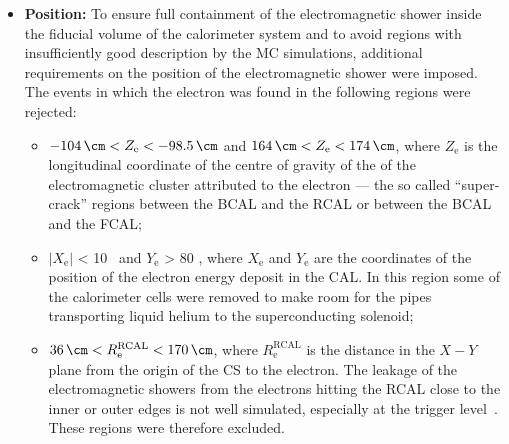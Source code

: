 \begin{itemize}
	have a distance of closest approach between the track extrapolation point at front surface of the CAL and the energy-cluster position of less than 10 cm. The track energy as measured by the tracking system had to be greater than 3 \GeV, because for higher energy electrons the bremsstrahlung energy loss is significant. In case the electron track was outside the acceptance region\footnote{The tracking system covers the region of polar angles restricted to $0.3 < \theta_\text{e} < 2.85$. } of the tracking detectors, the information from the calorimeter system was used to determine the position of the electron candidate.
	\item \textbf{Position:} To ensure full containment of the electromagnetic shower inside the fiducial volume of the calorimeter system and to avoid regions with insufficiently good description by the MC simulations, additional requirements on the position of the electromagnetic shower were imposed. The events in which the electron was found in the following regions were rejected:
	\begin{itemize}
		\item $ -104\, \cm < Z_\text{e} < -98.5\, \cm	$ and $ 164\, \cm < Z_\text{e} < 174\, \cm $, where $Z_\text{e}$ is the longitudinal coordinate of the centre of gravity of the of the electromagnetic cluster attributed to the electron --- the so called ``super-crack'' regions between the BCAL and the RCAL or between the BCAL and the FCAL;
		\item $\left| X_\text{e} \right|$ < 10 \cm\, and $Y_\text{e}$ > 80 \cm, where $X_\text{e}$ and $Y_\text{e}$ are the coordinates of the position of the electron energy deposit in the CAL. In this region some of the calorimeter cells were removed to make room for the  pipes transporting  liquid helium to the superconducting solenoid;
		\item $ 36\, \cm < R^\text{RCAL}_\text{e} < 170\, \cm $, where $R^\text{RCAL}_\text{e}$ is the distance in the $X-Y$ plane from the origin of the \zeus CS to the electron. The leakage of the electromagnetic showers from the electrons hitting the RCAL close to the inner or outer edges is not well simulated, especially at the trigger level~\cite{thesis:januschek:2011}. These regions were therefore excluded. 
	\end{itemize}
\end{itemize}


